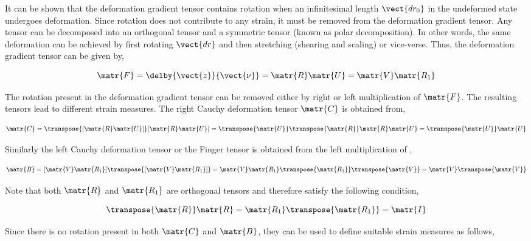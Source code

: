 It can be shown that the deformation gradient tensor contains rotation when an infinitesimal length $\vect{dr_{0}}$ in the undeformed state undergoes 
deformation. Since rotation does not contribute to any strain, it must be removed from the deformation gradient tensor. Any tensor can be decomposed 
into an orthogonal tensor and a symmetric tensor (known as polar decomposition). In other words, the same deformation can be achieved by first 
rotating $\vect{dr}$ and then stretching (shearing and scaling) or vice-verse. Thus, the deformation gradient tensor can be given by,

\begin{equation}
  \matr{F}=\delby{\vect{z}}{\vect{\nu}}=\matr{R}\matr{U}=\matr{V}\matr{R_{1}}
  \label{eqn:polardecomposition}
\end{equation}
 
The rotation present in the deformation gradient tensor can be removed either by right or left multiplication of $\matr{F}$. The resulting tensors 
lead to different strain measures. The right Cauchy deformation tensor $\matr{C}$ is obtained from,

\begin{equation}
  \matr{C}=\transpose{[\matr{R}\matr{U}]}[\matr{R}\matr{U}]=\transpose{\matr{U}}\transpose{\matr{R}}\matr{R}\matr{U}=\transpose{\matr{U}}\matr{U}
  \label{eqn:rightcauchy}
\end{equation}

Similarly the left Cauchy deformation tensor or the Finger tensor  is obtained from the left multiplication of ,

\begin{equation}
  \matr{B}=[\matr{V}\matr{R_{1}}]\transpose{[\matr{V}\matr{R_{1}}]}=\matr{V}\matr{R_{1}}\transpose{\matr{R_{1}}}\transpose{\matr{V}}=\matr{V}\transpose{\matr{V}}
  \label{eqn:leftcauchy}
\end{equation}

\noindent Note that both $\matr{R}$ and $\matr{R_{1}}$ are orthogonal tensors and therefore satisfy the following condition,

\begin{equation}
  \transpose{\matr{R}}\matr{R}=\matr{R_{1}}\transpose{\matr{R_{1}}}=\matr{I}
  \label{eqn:orthoganality}
\end{equation}

Since there is no rotation present in both $\matr{C}$ and $\matr{B}$, they can be used to define suitable strain measures as follows,

